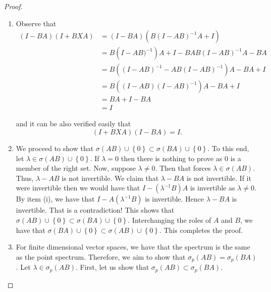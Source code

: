 \begin{proof}
    \begin{enumerate}[label=(\roman*)]
	\item Observe that 
	\begin{align*}
	\left( I-BA \right)\left( I+BXA \right) &= \left( I-BA \right) \left( B\left( I-AB \right)^{-1}A + I \right) \\
    &= B\left( I-AB)^{-1} \right)A + I - BAB \left( I-AB \right)^{-1} A - BA \\
    &= B \left( \left( I-AB \right)^{-1} - AB \left( I-AB \right)^{-1} \right)A - BA + I \\
    &= B\left( \left( I-AB \right) \left( I-AB \right)^{-1} \right) A - BA  + I\\
    &= BA + I -BA \\
    &= I
	\end{align*}

	and it can be also verified easily that
	\begin{equation*}
	    \left( I+BXA \right) \left( I-BA \right) = I.
	\end{equation*}
    \item We proceed to show that $\sigma \left( AB \right) \cup \left\{ 0 \right\} \subset \sigma \left( BA \right) \cup \left\{ 0 \right\}$. To this end, let $\lambda \in \sigma \left( AB \right) \cup \left\{ 0 \right\}$. If $\lambda =0$ then there is nothing to prove as $0$ is a member of the right set. Now, suppose $\lambda \ne 0$. Then that forces $\lambda \in \sigma \left( AB \right)$. Thus, $\lambda - AB$ is not invertible. We claim that $\lambda - BA$ is not invertible. If it were invertible then we would have that  $I-(\lambda^{-1}B)A$ is invertible as $\lambda \ne 0$. By item (i), we have that $I-A\left( \lambda^{-1} B \right)$ is invertible. Hence $\lambda-BA$ is invertible. That is a contradiction! This shows that $\sigma \left( AB \right) \cup \left\{ 0 \right\} \subset \sigma \left( BA \right) \cup \left\{ 0 \right\}$. Interchanging the roles of $A$ and $B$, we have that $\sigma \left( BA \right) \cup \left\{ 0 \right\} \subset \sigma \left( AB \right) \cup \left\{ 0 \right\}$. This completes the proof.
    \item  For finite dimensional vector spaces, we have that the spectrum is the same as the point spectrum. Therefore, we aim to show that $\sigma_{p} \left( AB \right) = \sigma _{p} \left( BA \right)$. Let $\lambda \in \sigma_{p} \left( AB \right)$. First, let us show that $\sigma_{p} \left( AB \right) \subset \sigma_{p} \left( BA \right)$.


\end{enumerate}
\end{proof}
